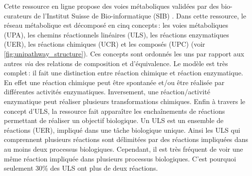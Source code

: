 \begin{refsegment}
    Cette ressource en ligne propose des voies métaboliques validées par des bio-curateurs de l’Institut Suisse de Bio-informatique (SIB) \cite{morgat2011unipathway}. Dans cette ressource, le réseau métabolique est décomposé en cinq concepts : les voies métaboliques (\gls{UPA}), les chemins réactionnels linéaires (\gls{ULS}), les réactions enzymatiques (\gls{UER}), les réactions chimiques (\gls{UCR}) et les composés (\gls{UPC}) (voir \cref{fig:unipathway_structure}). Ces concepts sont ordonnés les uns par rapport aux autres \textit{via} des relations de composition et d'équivalence. Le modèle est très complet : il fait une distinction entre réaction chimique et réaction enzymatique. En effet une réaction chimique peut être spontanée et/ou être réalisée par différentes activités enzymatiques. Inversement, une réaction/activité enzymatique peut réaliser plusieurs transformations chimiques. Enfin à travers le concept d'\gls{ULS}, la ressource fait apparaître les enchaînements de réactions permettant de réaliser un objectif biologique. Un \gls{ULS} est un ensemble de réactions (\gls{UER}), impliqué dans une tâche biologique unique. Ainsi les \gls{ULS} qui comprennent plusieurs réactions sont délimitées par des réactions impliquées dans au moins deux processus biologiques. Cependant, il est très fréquent de voir une même réaction impliquée dans plusieurs processus biologiques. C'est pourquoi seulement 30\% des \gls{ULS} ont plus de deux réactions.
    

\end{refsegment}
